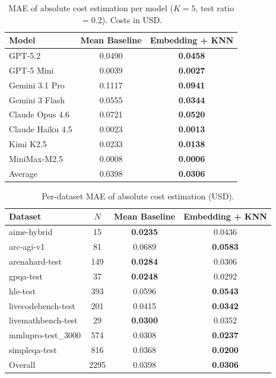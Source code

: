 \begin{table}[t]
\centering
\caption{MAE of absolute cost estimation per model ($K{=}5$, test ratio$=$0.2). Costs in USD.}
\label{tab:absolute-cost-mae}
\begin{tabular}{lcc}
\toprule
Model & Mean Baseline & Embedding + KNN \\
\midrule
GPT-5.2 & 0.0490 & \textbf{0.0458} \\
GPT-5 Mini & 0.0039 & \textbf{0.0027} \\
Gemini 3.1 Pro & 0.1117 & \textbf{0.0941} \\
Gemini 3 Flash & 0.0555 & \textbf{0.0344} \\
Claude Opus 4.6 & 0.0721 & \textbf{0.0520} \\
Claude Haiku 4.5 & 0.0023 & \textbf{0.0013} \\
Kimi K2.5 & 0.0233 & \textbf{0.0138} \\
MiniMax-M2.5 & 0.0008 & \textbf{0.0006} \\
\midrule
Average & 0.0398 & \textbf{0.0306} \\
\bottomrule
\end{tabular}
\end{table}

\begin{table}[t]
\centering
\caption{Per-dataset MAE of absolute cost estimation (USD).}
\label{tab:absolute-cost-mae-dataset}
\begin{tabular}{lccc}
\toprule
Dataset & $N$ & Mean Baseline & Embedding + KNN \\
\midrule
aime-hybrid & 15 & \textbf{0.0235} & 0.0436 \\
arc-agi-v1 & 81 & 0.0689 & \textbf{0.0583} \\
arenahard-test & 149 & \textbf{0.0284} & 0.0306 \\
gpqa-test & 37 & \textbf{0.0248} & 0.0292 \\
hle-test & 393 & 0.0596 & \textbf{0.0543} \\
livecodebench-test & 201 & 0.0415 & \textbf{0.0342} \\
livemathbench-test & 29 & \textbf{0.0300} & 0.0352 \\
mmlupro-test_3000 & 574 & 0.0308 & \textbf{0.0237} \\
simpleqa-test & 816 & 0.0368 & \textbf{0.0200} \\
\midrule
Overall & 2295 & 0.0398 & \textbf{0.0306} \\
\bottomrule
\end{tabular}
\end{table}